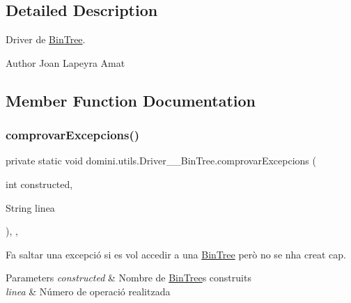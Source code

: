 \subsection{Detailed Description}
Driver de \hyperlink{classdomini_1_1utils_1_1BinTree}{Bin\+Tree}. 

\begin{DoxyAuthor}{Author}
Joan Lapeyra Amat 
\end{DoxyAuthor}


\subsection{Member Function Documentation}
\mbox{\label{classdomini_1_1utils_1_1Driver____BinTree_a06b6edeb965f3677c7ebb085d512f568}} 
\subsubsection{\texorpdfstring{comprovar\+Excepcions()}{comprovarExcepcions()}}
{\footnotesize\ttfamily private static void domini.\+utils.\+Driver\+\_\+\+\_\+\+Bin\+Tree.\+comprovar\+Excepcions (\begin{DoxyParamCaption}\item[{int}]{constructed,  }\item[{String}]{linea }\end{DoxyParamCaption})\hspace{0.3cm}{\ttfamily [inline]}, {\ttfamily [static]}, {\ttfamily [private]}}



Fa saltar una excepció si es vol accedir a una \hyperlink{classdomini_1_1utils_1_1BinTree}{Bin\+Tree} però no se n\textquotesingle{}ha creat cap. 


\begin{DoxyParams}{Parameters}
{\em constructed} & Nombre de \hyperlink{classdomini_1_1utils_1_1BinTree}{Bin\+Tree}\textquotesingle{}s construits \\
\hline
{\em linea} & Número de operació realitzada \\
\hline
\end{DoxyParams}
\mbox{\label{classdomini_1_1utils_1_1Driver____BinTree_a08875cef02b7a770a105b0b6b976a681}} 

